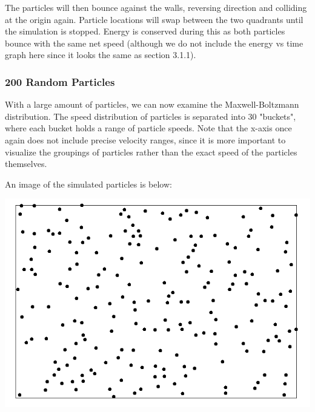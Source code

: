 \documentclass{article}
\begin{document}
The particles will then bounce against the walls, reversing direction and colliding at the origin again.
Particle locations will swap between the two quadrants until the simulation is stopped.
Energy is conserved during this as both particles bounce with the same net speed
(although we do not include the energy vs time graph here since it looks the same as section 3.1.1).

\subsubsection{200 Random Particles}
With a large amount of particles, we can now examine the Maxwell-Boltzmann distribution.
The speed distribution of particles is separated into 30 "buckets",
where each bucket holds a range of particle speeds.
Note that the x-axis once again does not include precise velocity ranges,
since it is more important to visualize the groupings of particles rather than the exact speed of the particles themselves.

An image of the simulated particles is below:
\\
\begin{center}
    \includegraphics[scale=0.5]{uncharged_random}
\end{center}
\end{document}
